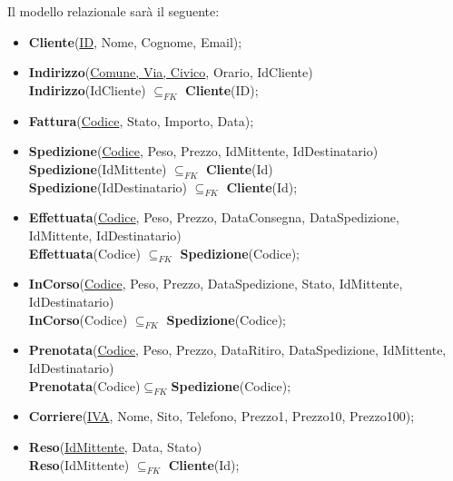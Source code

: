 Il modello relazionale sarà il seguente:
\begin{itemize}
  \item \textbf{Cliente}(\underline{ID}, Nome, Cognome, Email);
  \item \textbf{Indirizzo}(\underline{Comune, Via, Civico}, Orario, IdCliente) \\ \textbf{Indirizzo}(IdCliente) $\subseteq _{FK}$ \textbf{Cliente}(ID); 
  \item \textbf{Fattura}(\underline{Codice}, Stato, Importo, Data);
  \item \textbf{Spedizione}(\underline{Codice}, Peso, Prezzo, IdMittente, IdDestinatario) \\ \textbf{Spedizione}(IdMittente) $\subseteq _{FK}$ \textbf{Cliente}(Id) \\ \textbf{Spedizione}(IdDestinatario) $\subseteq _{FK}$ \textbf{Cliente}(Id);
  \item \textbf{Effettuata}(\underline{Codice}, Peso, Prezzo, DataConsegna, DataSpedizione, IdMittente, IdDestinatario)\\\textbf{Effettuata}(Codice) $\subseteq _{FK}$ \textbf{Spedizione}(Codice);
  \item \textbf{InCorso}(\underline{Codice}, Peso, Prezzo, DataSpedizione, Stato, IdMittente, IdDestinatario) \\ \textbf{InCorso}(Codice) $\subseteq _{FK}$ \textbf{Spedizione}(Codice);
  \item \textbf{Prenotata}(\underline{Codice}, Peso, Prezzo, DataRitiro, DataSpedizione, IdMittente, \\IdDestinatario) \\\textbf{Prenotata}(Codice)$\subseteq _{FK}$\textbf{Spedizione}(Codice);
  \item \textbf{Corriere}(\underline{IVA}, Nome, Sito, Telefono, Prezzo1, Prezzo10, Prezzo100);
  \item \textbf{Reso}(\underline{IdMittente}, Data, Stato)\\ \textbf{Reso}(IdMittente) $\subseteq _{FK}$ \textbf{Cliente}(Id);

\end{itemize}
